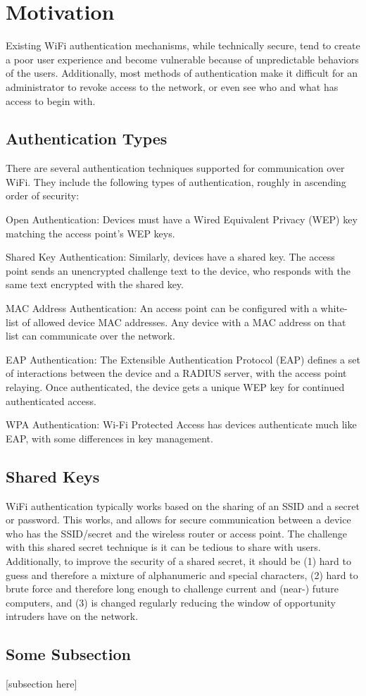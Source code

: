 \section{Motivation}
\label{section:motivation}
Existing WiFi authentication mechanisms, while technically secure, tend to create a poor user
experience and become vulnerable because of unpredictable behaviors of the users. Additionally,
most methods of authentication make it difficult for an administrator to revoke access to the
network, or even see who and what has access to begin with.

\subsection{Authentication Types}
There are several authentication techniques supported for communication over WiFi. They include
the following types of authentication, roughly in ascending order of security: \cite{WifiAuthenticationTypes}
\begin{description}
  \item{Open Authentication:} Devices must have a Wired Equivalent Privacy (WEP) key matching the access point's WEP keys.
  \item{Shared Key Authentication:} Similarly, devices have a shared key. The access point sends an unencrypted challenge text to the device, who responds with the same text encrypted with the shared key.
  \item{MAC Address Authentication:} An access point can be configured with a white-list of allowed device MAC addresses. Any device with a MAC address on that list can communicate over the network.
  \item{EAP Authentication:} The Extensible Authentication Protocol (EAP) defines a set of interactions between the device and a RADIUS server, with the access point relaying. Once authenticated, the device gets a unique WEP key for continued authenticated access.
  \item{WPA Authentication:} Wi-Fi Protected Access has devices authenticate much like EAP, with some differences in key management.
\end{description}

\subsection{Shared Keys}
WiFi authentication typically works based on the sharing of an SSID and a secret or password.
This works, and allows for secure communication between a device who has the SSID/secret and
the wireless router or access point. The challenge with this shared secret technique is it
can be tedious to share with users. Additionally, to improve the security of a shared secret,
it should be (1) hard to guess and therefore a mixture of alphanumeric and special characters,
(2) hard to brute force and therefore long enough to challenge current and (near-) future computers,
and (3) is changed regularly reducing the window of opportunity intruders have on the network.



\subsection{Some Subsection}
[subsection here]
